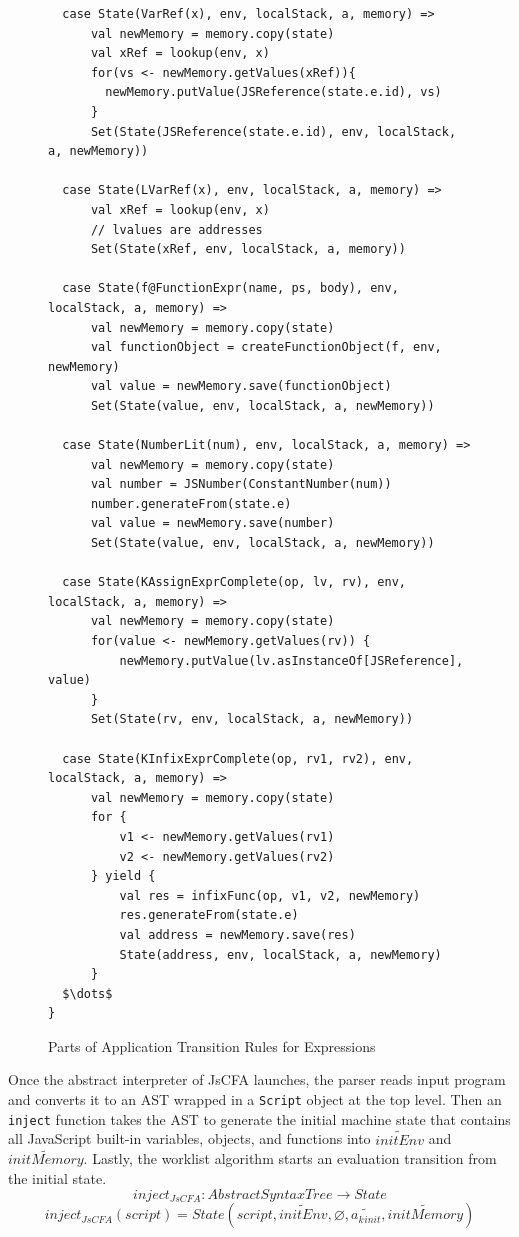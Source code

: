 \documentclass[12pt]{report}
\begin{document}
\begin{figure}
\lstset{language=Scala, mathescape,
basicstyle=\scriptsize\ttfamily}
\begin{lstlisting}
  case State(VarRef(x), env, localStack, a, memory) =>
      val newMemory = memory.copy(state)
      val xRef = lookup(env, x)
      for(vs <- newMemory.getValues(xRef)){
        newMemory.putValue(JSReference(state.e.id), vs)
      }
      Set(State(JSReference(state.e.id), env, localStack, a, newMemory))

  case State(LVarRef(x), env, localStack, a, memory) =>
      val xRef = lookup(env, x)
      // lvalues are addresses
      Set(State(xRef, env, localStack, a, memory))

  case State(f@FunctionExpr(name, ps, body), env, localStack, a, memory) =>
      val newMemory = memory.copy(state)
      val functionObject = createFunctionObject(f, env, newMemory)
      val value = newMemory.save(functionObject)
      Set(State(value, env, localStack, a, newMemory))

  case State(NumberLit(num), env, localStack, a, memory) =>
      val newMemory = memory.copy(state)
      val number = JSNumber(ConstantNumber(num))
      number.generateFrom(state.e)
      val value = newMemory.save(number)
      Set(State(value, env, localStack, a, newMemory))

  case State(KAssignExprComplete(op, lv, rv), env, localStack, a, memory) =>
      val newMemory = memory.copy(state)
      for(value <- newMemory.getValues(rv)) {
          newMemory.putValue(lv.asInstanceOf[JSReference], value)
      }
      Set(State(rv, env, localStack, a, newMemory))

  case State(KInfixExprComplete(op, rv1, rv2), env, localStack, a, memory) =>
      val newMemory = memory.copy(state)
      for {
          v1 <- newMemory.getValues(rv1)
          v2 <- newMemory.getValues(rv2)
      } yield {
          val res = infixFunc(op, v1, v2, newMemory)
          res.generateFrom(state.e)
          val address = newMemory.save(res)
          State(address, env, localStack, a, newMemory)
      }
  $\dots$
}
\end{lstlisting}
\caption{Parts of Application Transition Rules for Expressions}
\label{fig:app-expr}
\end{figure}

Once the abstract interpreter of JsCFA launches, the parser reads input program and converts it to an AST wrapped in a \verb|Script| object at the top level.
Then an \verb|inject| function takes the AST to generate the initial machine state that contains all JavaScript built-in variables, objects, and functions into $\widetilde{initEnv}$ and $\widetilde{initMemory}$. Lastly, the worklist algorithm starts an evaluation transition from the initial state.
\[
inject_{JsCFA} : AbstractSyntaxTree \to State
\]
\[
inject_{JsCFA}(script) = State(script, \widetilde{initEnv}, \varnothing, \widetilde{a_k{}_{init}}, \widetilde{initMemory})
\]
\end{document}
